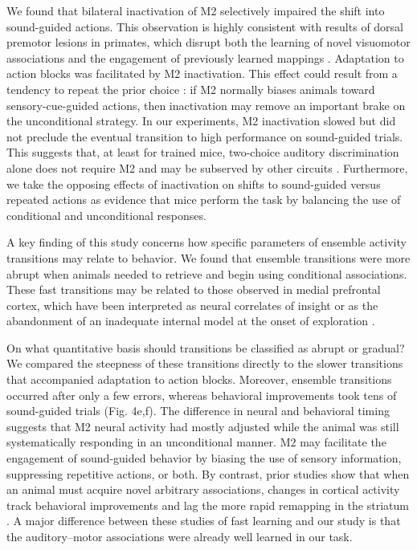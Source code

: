 We found that bilateral inactivation of M2 selectively impaired the shift into sound-guided actions. This observation is highly consistent with results of dorsal premotor lesions in primates, which disrupt both the learning of novel visuomotor associations and the engagement of previously learned mappings \citep{petrides1985deficits,halsband1985premotor,nixon2004cortico}. Adaptation to action blocks was facilitated by M2 inactivation. This effect could result from a tendency to repeat the prior choice \citep{sul2011role}: if M2 normally biases animals toward sensory-cue-guided actions, then inactivation may remove an important brake on the unconditional strategy. In our experiments, M2 inactivation slowed but did not preclude the eventual transition to high performance on sound-guided trials. This suggests that, at least for trained mice, two-choice auditory discrimination alone does not require M2 and may be subserved by other circuits \citep{znamenskiy2013corticostriatal}. Furthermore, we take the opposing effects of inactivation on shifts to sound-guided versus repeated actions as evidence that mice perform the task by balancing the use of conditional and unconditional responses.

A key finding of this study concerns how specific parameters of ensemble activity transitions may relate to behavior. We found that ensemble transitions were more abrupt when animals needed to retrieve and begin using conditional associations. These fast transitions may be related to those observed in medial prefrontal cortex, which have been interpreted as neural correlates of insight \citep{durstewitz2010abrupt} or as the abandonment of an inadequate internal model at the onset of exploration \citep{karlsson2012network}. 

On what quantitative basis should transitions be classified as abrupt or gradual? We compared the steepness of these transitions directly to the slower transitions that accompanied adaptation to action blocks. Moreover, ensemble transitions occurred after only a few errors, whereas behavioral improvements took tens of sound-guided trials (Fig. 4e,f). The difference in neural and behavioral timing suggests that M2 neural activity had mostly adjusted while the animal was still systematically responding in an unconditional manner. M2 may facilitate the engagement of sound-guided behavior by biasing the use of sensory information, suppressing repetitive actions, or both. By contrast, prior studies show that when an animal must acquire novel arbitrary associations, changes in cortical activity track behavioral improvements \citep{mitz1991learning,brasted2004comparison} and lag the more rapid remapping in the striatum \citep{pasupathy2005different}. A major difference between these studies of fast learning and our study is that the auditory–motor associations were already well learned in our task.

